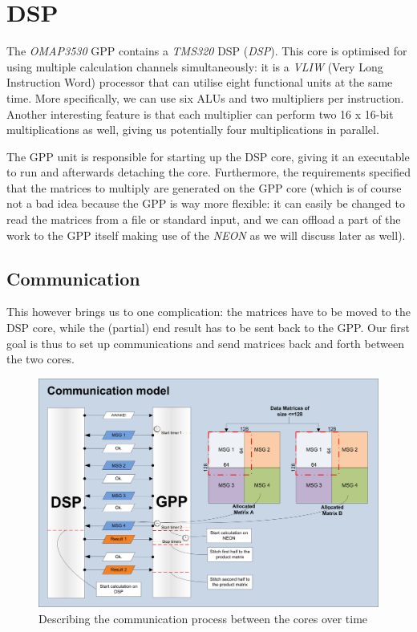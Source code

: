 \section{DSP}
The \emph{OMAP3530} GPP contains a \emph{TMS320} DSP (\emph{DSP})\cite{gpp-refman}. This
core is optimised for using multiple calculation channels simultaneously: it is
a \emph{VLIW} (Very Long Instruction Word) processor that can utilise eight
functional units at the same time. More specifically, we can use six ALUs and
two multipliers per instruction. Another interesting feature is that each
multiplier can perform two 16 x 16-bit multiplications as well\cite{dsp-refman}, giving us
potentially four multiplications in parallel.

The GPP unit is responsible for starting up the DSP core, giving it an executable to run
and afterwards detaching the core. Furthermore, the requirements specified
that the matrices to multiply are generated on the GPP core (which is
of course not a bad idea because the GPP is way more flexible: it can easily
be changed to read the matrices from a file or standard input, and we can
offload a part of the work to the GPP itself making use of the \emph{NEON} as we
will discuss later as well).

\subsection{Communication}
This however brings us to one complication: the matrices have to be moved to
the DSP core, while the (partial) end result has to be sent back to the GPP.
Our first goal is thus to set up communications and send matrices back and forth
between the two cores.

\begin{figure}[h]
\includegraphics[width=\textwidth]{images/gpp_dsp_com}
\caption{Describing the communication process between the cores over time}
\label{fig:gpp_dsp_com}
\end{figure}

